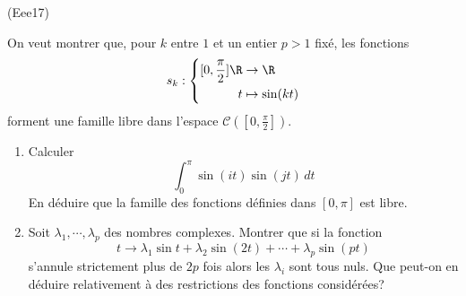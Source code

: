 \begin{tiny}(Eee17)\end{tiny} On veut montrer que, pour $k$ entre $1$ et un entier $p>1$ fixé, les fonctions
\begin{displaymath}
 s_k:
\left\lbrace 
\begin{aligned}
 [0,\frac{\pi}{2}] \R &\rightarrow \R \\
t &\mapsto \sin(kt)
\end{aligned}
\right. 
\end{displaymath}
forment une famille libre dans l'espace $\mathcal{C}([0,\frac{\pi}{2}])$.
\begin{enumerate}
 \item Calculer
\begin{displaymath}
 \int_0 ^\pi \sin(it)\sin(jt)\,dt
\end{displaymath}
En déduire que la famille des fonctions définies dans $[0,\pi]$ est libre.
\item Soit $\lambda_1,\cdots,\lambda_p$ des nombres complexes. Montrer que si la fonction
\begin{displaymath}
 t\rightarrow \lambda_1 \sin t + \lambda_2\sin(2t)+\cdots + \lambda_p \sin(pt)
\end{displaymath}
s'annule strictement plus de $2p$ fois alors les $\lambda_i$ sont tous nuls. Que peut-on en déduire relativement à des restrictions des fonctions considérées?
\end{enumerate}

